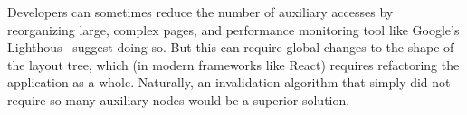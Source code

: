 Developers can sometimes reduce the number of auxiliary accesses
  by reorganizing large, complex pages,
  and performance monitoring tool
  like Google's Lighthous~\cite{lighthouse}
  suggest doing so.
But this can require global changes to the shape of the layout tree,
  which (in modern frameworks like React)
  requires refactoring the application as a whole.
Naturally, an invalidation algorithm that simply
  did not require so many auxiliary nodes
  would be a superior solution.
